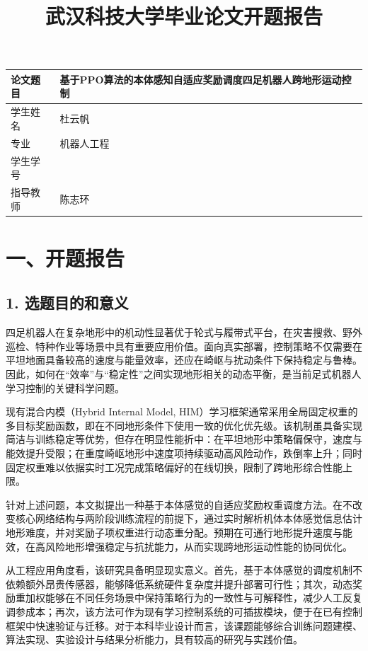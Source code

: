 \documentclass[12pt,a4paper]{ctexart}
\title{武汉科技大学毕业论文开题报告\\}
\author{}
\date{}
\begin{document}
\maketitle

\begin{longtable}{|>{\raggedright\arraybackslash}p{3.2cm}|>{\raggedright\arraybackslash}p{11.1cm}|}
\hline
论文题目 & 基于PPO算法的本体感知自适应奖励调度四足机器人跨地形运动控制 \\
\hline
学生姓名 & 杜云帆 \\
\hline
专业 & 机器人工程 \\
\hline
学生学号 & 202204416388 \\
\hline
指导教师 & 陈志环 \\
\hline
\end{longtable}

\section*{一、开题报告}

\subsection*{1. 选题目的和意义}
四足机器人在复杂地形中的机动性显著优于轮式与履带式平台，在灾害搜救、野外巡检、特种作业等场景中具有重要应用价值。面向真实部署，控制策略不仅需要在平坦地面具备较高的速度与能量效率，还应在崎岖与扰动条件下保持稳定与鲁棒。因此，如何在“效率”与“稳定性”之间实现地形相关的动态平衡，是当前足式机器人学习控制的关键科学问题。

现有混合内模（Hybrid Internal Model, HIM）学习框架通常采用全局固定权重的多目标奖励函数，即在不同地形条件下使用一致的优化优先级。该机制虽具备实现简洁与训练稳定等优势，但存在明显性能折中：在平坦地形中策略偏保守，速度与能效提升受限；在重度崎岖地形中速度项持续驱动高风险动作，跌倒率上升；同时固定权重难以依据实时工况完成策略偏好的在线切换，限制了跨地形综合性能上限。

针对上述问题，本文拟提出一种基于本体感觉的自适应奖励权重调度方法。在不改变核心网络结构与两阶段训练流程的前提下，通过实时解析机体本体感觉信息估计地形难度，并对奖励子项权重进行动态重分配。预期在可通行地形提升速度与能效，在高风险地形增强稳定与抗扰能力，从而实现跨地形运动性能的协同优化。

从工程应用角度看，该研究具备明显现实意义。首先，基于本体感觉的调度机制不依赖额外昂贵传感器，能够降低系统硬件复杂度并提升部署可行性；其次，动态奖励重加权能够在不同任务场景中保持策略行为的一致性与可解释性，减少人工反复调参成本；再次，该方法可作为现有学习控制系统的可插拔模块，便于在已有控制框架中快速验证与迁移。对于本科毕业设计而言，该课题能够综合训练问题建模、算法实现、实验设计与结果分析能力，具有较高的研究与实践价值。
\end{document}
